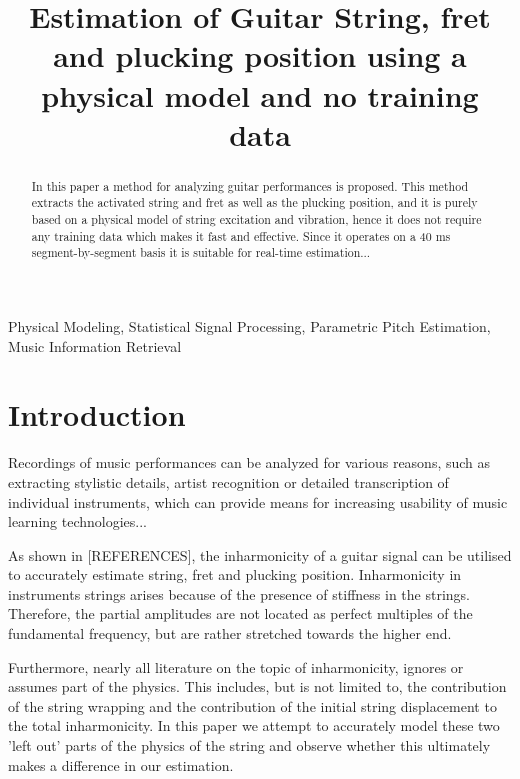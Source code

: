 \documentclass{article}
\title{Estimation of Guitar String, fret and plucking position using a physical model and no training data}
\begin{document}
\ninept
\maketitle

\begin{sloppy}

\begin{abstract}
  In this paper a method for analyzing guitar performances is proposed. This method extracts the activated string and fret as well as the plucking position, and it is purely based on a physical model of string excitation and vibration, hence it does not require any training data which makes it fast and effective. Since it operates on a 40 ms segment-by-segment basis it is suitable for real-time estimation...
\end{abstract}
%
\begin{keywords}
 Physical Modeling, Statistical Signal Processing, Parametric Pitch Estimation, Music Information Retrieval\vspace{-.8mm}
 \end{keywords}
%
\section{Introduction}
\label{sec:intro}
%
Recordings of music performances can be analyzed for various reasons, such as extracting stylistic details, artist recognition or detailed transcription of individual instruments, which can provide means for increasing usability of music learning technologies...

As shown in [REFERENCES], the inharmonicity of a guitar signal can be utilised to accurately estimate string, fret and plucking position. Inharmonicity in instruments strings arises because of the presence of stiffness in the strings. Therefore, the partial amplitudes are not located as perfect multiples of the fundamental frequency, but are rather stretched towards the higher end.

Furthermore, nearly all literature on the topic of inharmonicity, ignores or assumes part of the physics. This includes, but is not limited to, the contribution of the string wrapping and the contribution of the initial string displacement to the total inharmonicity. In this paper we attempt to accurately model these two 'left out' parts of the physics of the string and observe whether this ultimately makes a difference in our estimation.


\end{sloppy}
\end{document}
